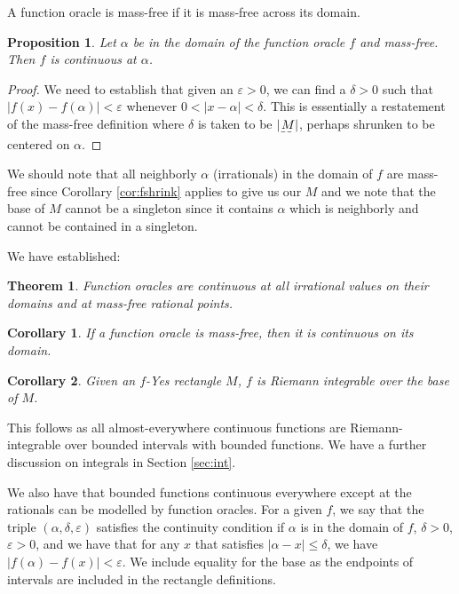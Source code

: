 \documentclass[12pt]{article}
\newtheorem{theorem}{Theorem}[section]
\newtheorem{corollary}{Corollary}[section]
\newtheorem{proposition}{Proposition}[section]
\begin{document}
 A function oracle is mass-free if it is mass-free across its domain.  

\begin{proposition}
Let $\alpha$ be in the domain of the function oracle $f$ and mass-free. Then $f$ is continuous at $\alpha$.
\end{proposition}

\begin{proof}
    We need to establish that given an $\varepsilon > 0$, we can find a $\delta > 0$ such that $|f(x) - f(\alpha)| < \varepsilon$ whenever $0 < |x - \alpha| < \delta$. This is essentially a restatement of the mass-free definition where $\delta$ is taken to be $|\base{M}|$, perhaps shrunken to be centered on $\alpha$. 
\end{proof}

We should note that all neighborly $\alpha$ (irrationals) in the domain of $f$ are mass-free since Corollary \ref{cor:fshrink} applies to give us our $M$ and we note that the base of $M$ cannot be a singleton since it contains $\alpha$ which is neighborly and cannot be contained in a singleton.

We have established:

\begin{theorem}
    Function oracles are continuous at all irrational values on their domains and at mass-free rational points. 
\end{theorem}

\begin{corollary}
If a function oracle is mass-free, then it is continuous on its domain. 
\end{corollary}

\begin{corollary}
Given an $f$-Yes rectangle $M$, $f$ is Riemann integrable over the base of $M$. 
\end{corollary}

This follows as all almost-everywhere continuous functions are Riemann-integrable over bounded intervals with bounded functions. We have a further  discussion on integrals in Section \ref{sec:int}.

We also have that bounded functions continuous everywhere except at the rationals can be modelled by function oracles. For a given $f$, we say that the triple $(\alpha, \delta, \varepsilon)$ satisfies the continuity condition if $\alpha$ is in the domain of $f$, $\delta > 0$, $\varepsilon > 0$, and we have that for any $x$ that satisfies $|\alpha - x| \leq \delta$, we have $|f(\alpha) - f(x) | < \varepsilon$. We include equality for the base as the endpoints of intervals are included in the rectangle definitions.
\end{document}
